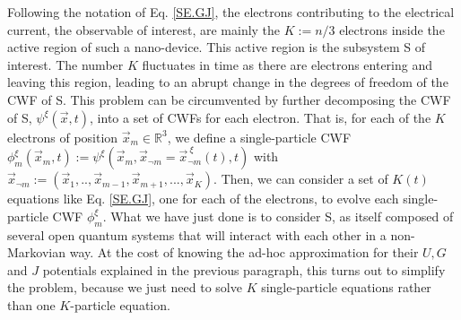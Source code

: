 \documentclass[11pt, a4paper]{article} %
\newcommand{\R}{\mathbb{R}} %
\begin{document}
Following the notation of Eq. \eqref{SE.GJ}, the electrons contributing to the electrical current, the observable of interest, are mainly the $K:=n/3$ electrons inside the active region of such a nano-device. This active region is the subsystem S of interest. The number $K$ fluctuates in time as there are electrons entering and leaving this region, leading to an abrupt change in the degrees of freedom of the CWF of S. This problem can be circumvented  by further decomposing the CWF of S, $\psi^{\xi}(\vec{x},t)$, into a set of CWFs for each electron. That is, for each of the $K$ electrons of position $\vec{x}_m\in\R^3$, we define a single-particle CWF $\phi_m^\xi(\vec{x}_m, t):=\psi^{\xi}(\vec{x}_m, \vec{x}_{\neg m}=\vec{x}_{\neg m}^{\:\xi}(t),t)$ with $\vec{x}_{\neg m}:=(\vec{x}_1,..,\vec{x}_{m-1}, \vec{x}_{m+1}, ...,\vec{x}_{K})$. Then, we can consider a set of $K(t)$ equations like Eq. \eqref{SE.GJ}, one for each of the electrons, to evolve each single-particle CWF $\phi_m^\xi$. What we have just done is to consider S, as itself composed of several open quantum systems that will interact with each other in a non-Markovian way. At the cost of knowing the ad-hoc approximation for their $U,G$ and $J$ potentials explained in the previous paragraph, this turns out to simplify the problem, because we just need to solve $K$ single-particle equations rather than one $K$-particle equation.
\end{document}
